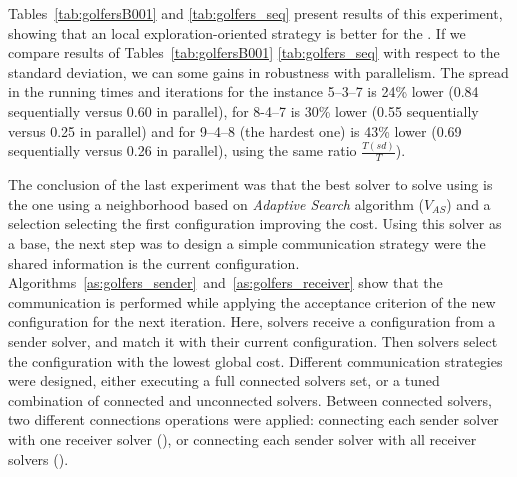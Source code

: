 Tables~\ref{tab:golfersB001} and \ref{tab:golfers_seq} present results of this experiment, showing that an local exploration-oriented strategy is better for the \SGP. If we compare results of Tables~\ref{tab:golfersB001} \ref{tab:golfers_seq} with respect to the standard deviation, we can some gains in robustness with parallelism. The spread in the running times and iterations for the instance 5--3--7 is 24\% lower (0.84 sequentially versus 0.60 in parallel), for 8-4--7 is 30\% lower (0.55 sequentially versus 0.25 in parallel) and for 9--4--8 (the hardest one) is 43\% lower (0.69 sequentially versus 0.26 in parallel), using the same ratio $\tfrac{T(sd)}{T}$).

\separation

The conclusion of the last experiment was that the best solver to solve \SGP{} using \posl{} is the one using a neighborhood \om{} based on {\it Adaptive Search} algorithm ($V_{AS}$) and a selection \om{} selecting the first configuration improving the cost. Using this solver as a base, the next step was to design a simple communication strategy were the shared information is the current configuration. Algorithms~\ref{as:golfers_sender}~and~\ref{as:golfers_receiver} show that the communication is performed while applying the acceptance criterion of the new configuration for the next iteration. Here, solvers receive a configuration from a sender solver, and match it with their current configuration. Then solvers select the configuration with the lowest global cost. Different communication strategies were designed, either executing a full connected solvers set, or a tuned combination of connected and unconnected solvers. Between connected solvers, two different connections operations were applied: connecting each sender solver with one receiver solver (\oneTone), or connecting each sender solver with all receiver solvers (\oneTn).

